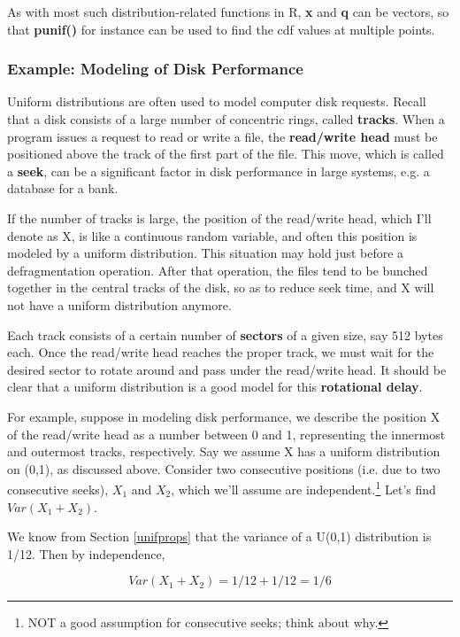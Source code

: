 As with most such distribution-related functions in R, {\bf x} and {\bf
q} can be vectors, so that {\bf punif()} for instance can be used to
find the cdf values at multiple points.

\subsubsection{Example:  Modeling of Disk Performance}

Uniform distributions are often used to model computer disk requests.
Recall that a disk consists of a large number of concentric rings,
called {\bf tracks}.  When a program issues a request to read or write a
file, the {\bf read/write head} must be positioned above the track of
the first part of the file.  This move, which is called a {\bf seek},
can be a significant factor in disk performance in large systems, e.g. a
database for a bank.

\label{defrag}
If the number of tracks is large, the position of the read/write head,
which I'll denote as X, is like a continuous random variable, and 
often this position is modeled by a uniform distribution.  This 
situation may hold just before a defragmentation operation.  After 
that operation, the files tend to be bunched together in the central 
tracks of the disk, so as to reduce seek time, and X will not have a
uniform distribution anymore.

Each track consists of a certain number of {\bf sectors} of a given
size, say 512 bytes each.  Once the read/write head reaches the proper
track, we must wait for the desired sector to rotate around and pass
under the read/write head.  It should be clear that a uniform
distribution is a good model for this {\bf rotational delay}.

For example, suppose in modeling disk performance, we describe the
position X of the read/write head as a number between 0 and 1,
representing the innermost and outermost tracks, respectively.  Say we
assume X has a uniform distribution on (0,1), as discussed above.
Consider two consecutive positions (i.e.  due to two consecutive seeks),
$X_1$ and $X_2$, which we'll assume are independent.\footnote{NOT a good
assumption for consecutive seeks; think about why.} Let's find $Var(X_1
+ X_2)$.

We know from Section \ref{unifprops} that the variance of a U(0,1)
distribution is 1/12.  Then by independence,

\begin{equation}
Var(X_1 + X_2) = 1/12 + 1/12 = 1/6
\end{equation}

